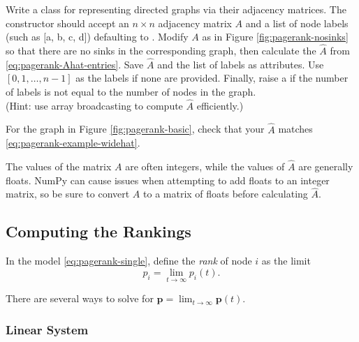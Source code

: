 \begin{problem} %
Write a class for representing directed graphs via their adjacency matrices.
The constructor should accept an $n\times n$ adjacency matrix $A$ and a list of node labels (such as $[$a, b, c, d$]$) defaulting to .
Modify $A$ as in Figure \ref{fig:pagerank-nosinks} so that there are no sinks in the corresponding graph, then calculate the $\widehat{A}$ from \eqref{eq:pagerank-Ahat-entries}.
Save $\widehat{A}$ and the list of labels as attributes.
Use $[0,1,\ldots,n-1]$ as the labels if none are provided.
Finally, raise a  if the number of labels is not equal to the number of nodes in the graph.
\\(Hint: use array broadcasting to compute $\widehat{A}$ efficiently.)

For the graph in Figure \ref{fig:pagerank-basic}, check that your $\widehat{A}$ matches \eqref{eq:pagerank-example-widehat}.
\label{prob:pagerank-init}

\begin{warn} %
    The values of the matrix $A$ are often integers, while the values of $\widehat{A}$ are generally floats.
    NumPy can cause issues when attempting to add floats to an integer matrix, so be sure to convert $A$ to a matrix of floats before calculating $\widehat{A}.$
\end{warn}

\end{problem}

\subsection*{Computing the Rankings} %

In the model \eqref{eq:pagerank-single}, define the \emph{rank} of node $i$ as the limit
\[
p_i = \lim_{t\to \infty} p_i(t).
\]
\begin{comment} %
For those familiar with Markov Chains, Equation \ref{eq:pagerank-matrix} defines a Markov chain.
Page ranks are simply the steady state of this Markov chain.
\end{comment}
There are several ways to solve for $\mathbf{p} = \lim_{t\rightarrow\infty} \mathbf{p}(t)$.

\subsubsection*{Linear System} %

